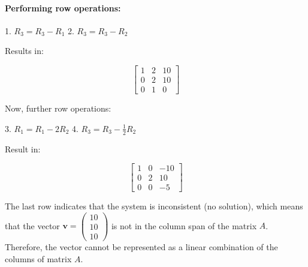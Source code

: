 \paragraph{Performing row operations:}

1. \( R_3 = R_3 - R_1 \)
2. \( R_3 = R_3 - R_2 \)

Results in:

\[ \left[\begin{array}{cc|c} 1 & 2 & 10 \\ 0 & 2 & 10 \\ 0 & 1 & 0 \end{array}\right] \]

Now, further row operations:

3. \( R_1 = R_1 - 2R_2 \)
4. \( R_3 = R_3 - \frac{1}{2}R_2 \)

Result in:

\[ \left[\begin{array}{cc|c} 1 & 0 & -10 \\ 0 & 2 & 10 \\ 0 & 0 & -5 \end{array}\right] \]

The last row indicates that the system is inconsistent (no solution), which means that the vector \( \mathbf{v} = \begin{pmatrix} 10 \\ 10 \\ 10 \end{pmatrix} \) is not in the column span of the matrix \( A \). Therefore, the vector cannot be represented as a linear combination of the columns of matrix \( A \).